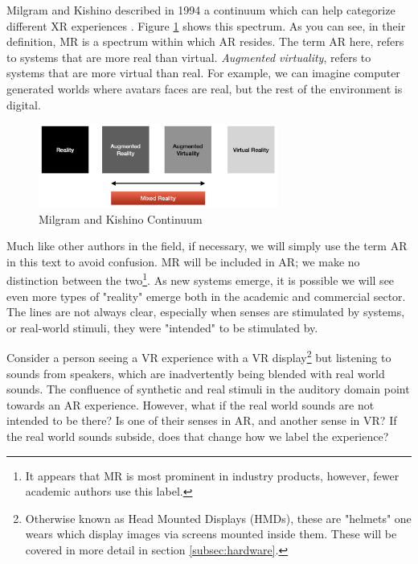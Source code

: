 Milgram and Kishino described in 1994 a continuum which can help categorize different XR experiences \cite{schmalstieg2016augmented}. Figure \ref{fig:continuum} shows this spectrum. As you can see, in their definition, MR is a spectrum within which AR resides. The term AR here, refers to systems that are more real than virtual. \textit{Augmented virtuality}, refers to systems that are more virtual than real. For example, we can imagine computer generated worlds where avatars faces are real, but the rest of the environment is digital.

\begin{figure}[ht!]%
\centering
\includegraphics[width=0.7\textwidth]{img/continuum.png} 
\caption{Milgram and Kishino Continuum}
\label{fig:continuum}
\end{figure}

Much like other authors in the field, if necessary, we will simply use the term AR in this text to avoid confusion. MR will be included in AR; we make no distinction between the two\footnote{It appears that MR is most prominent in industry products, however, fewer academic authors use this label.}. As new systems emerge, it is possible we will see even more types of "reality" emerge both in the academic and commercial sector. The lines are not always clear, especially when senses are stimulated by systems, or real-world stimuli, they were "intended" to be stimulated by. 

Consider a person seeing a VR experience with a VR display\footnote{Otherwise known as Head Mounted Displays (HMDs), these are "helmets" one wears which display images via screens mounted inside them. These will be covered in more detail in section \ref{subsec:hardware}.} but listening to sounds from speakers, which are inadvertently being blended with real world sounds. The confluence of synthetic and real stimuli in the auditory domain point towards an AR experience. However, what if the real world sounds are not intended to be there? Is one of their senses in AR, and another sense in VR? If the real world sounds subside, does that change how we label the experience? 

